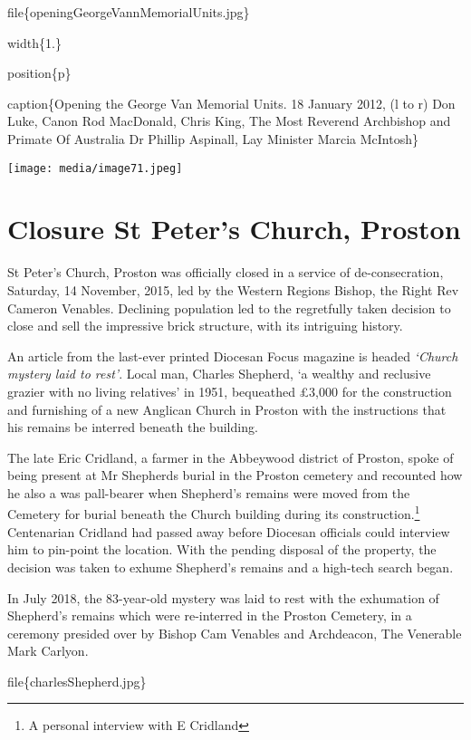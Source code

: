 file\{openingGeorgeVannMemorialUnits.jpg\}

width\{1.\}

position\{p\}

caption\{Opening the George Van Memorial Units. 18 January 2012, (l to r) Don Luke, Canon Rod MacDonald, Chris King, The Most Reverend Archbishop and Primate Of Australia Dr Phillip Aspinall, Lay Minister Marcia McIntosh\}

\texttt{[image: media/image71.jpeg]}

\hypertarget{closure-st-peters-church-proston}{%
\section{Closure St Peter's Church, Proston}\label{closure-st-peters-church-proston}}

St Peter's Church, Proston was officially closed in a service of de-consecration, Saturday, 14 November, 2015, led by the Western Regions Bishop, the Right Rev Cameron Venables. Declining population led to the regretfully taken decision to close and sell the impressive brick structure, with its intriguing history.

An article from the last-ever printed Diocesan Focus magazine is headed \emph{`Church mystery laid to rest'}. Local man, Charles Shepherd, `a wealthy and reclusive grazier with no living relatives' in 1951, bequeathed £3,000 for the construction and furnishing of a new Anglican Church in Proston with the instructions that his remains be interred beneath the building.

The late Eric Cridland, a farmer in the Abbeywood district of Proston, spoke of being present at Mr Shepherds burial in the Proston cemetery and recounted how he also a was pall-bearer when Shepherd's remains were moved from the Cemetery for burial beneath the Church building during its construction.\footnote{A personal interview with E Cridland} Centenarian Cridland had passed away before Diocesan officials could interview him to pin-point the location. With the pending disposal of the property, the decision was taken to exhume Shepherd's remains and a high-tech search began.

In July 2018, the 83-year-old mystery was laid to rest with the exhumation of Shepherd's remains which were re-interred in the Proston Cemetery, in a ceremony presided over by Bishop Cam Venables and Archdeacon, The Venerable Mark Carlyon.

file\{charlesShepherd.jpg\}

